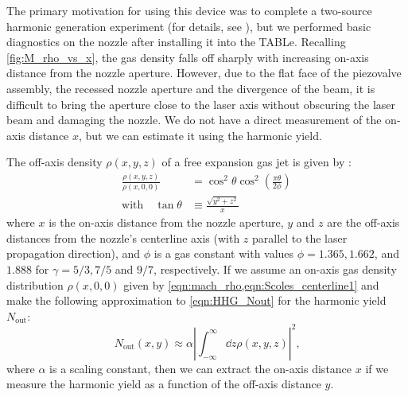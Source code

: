 The primary motivation for using this device was to complete a two-source harmonic generation experiment (for details, see \cite{hagemanComplexAttosecondTransient2020}), but we performed basic diagnostics on the nozzle after installing it into the TABLe. Recalling \cref{fig:M_rho_vs_x}, the gas density falls off sharply with increasing on-axis distance from the nozzle aperture. However, due to the flat face of the piezovalve assembly, the recessed nozzle aperture and the divergence of the beam, it is difficult to bring the aperture close to the laser axis without obscuring the laser beam and damaging the nozzle. We do not have a direct measurement of the on-axis distance $x$, but we can estimate it using the harmonic yield.

The off-axis density $\rho(x,y,z)$ of a free expansion gas jet is given by \cite{millerFreeJetSources1988}:
\begin{align}
\frac{\rho(x,y,z)}{\rho(x,0,0)} &= \cos^2 \theta \cos^2 \left( \frac{\pi \theta}{2 \phi} \right) \\
\textrm{with} \quad \tan \theta &\equiv \frac{\sqrt{y^2+z^2}}{x}
\label{eqn:off-axis-density}
\end{align}
where $x$ is the on-axis distance from the nozzle aperture, $y$ and $z$ are the off-axis distances from the nozzle's centerline axis (with $z$ parallel to the laser propagation direction), and $\phi$ is a gas constant with values ${\phi = 1.365, 1.662}$, and $1.888$ for ${\gamma = 5/3, 7/5}$ and $9/7$, respectively. If we assume an on-axis gas density distribution $\rho(x,0,0)$ given by \cref{eqn:mach_rho,eqn:Scoles_centerline1} and make the following approximation to \cref{eqn:HHG_Nout} for the harmonic yield $N_{\textrm{out}}$:
\begin{equation}
N_{\textrm{out}}(x, y) \approx \alpha \left| \int_{-\infty}^{\infty} \dd{z} \rho(x,y,z) \right|^2 \textrm{,}
\label{eqn:Nout_approx}
\end{equation}
where $\alpha$ is a scaling constant, then we can extract the on-axis distance $x$ if we measure the harmonic yield as a function of the off-axis distance $y$.

